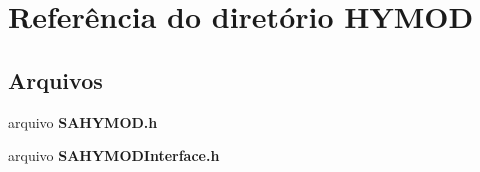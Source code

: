\section{Referência do diretório H\+Y\+M\+OD}
\label{dir_b4ae1e3ddeaf0c87bd6b41d18040ad84}
\subsection*{Arquivos}
\begin{DoxyCompactItemize}
\item 
arquivo {\bf S\+A\+H\+Y\+M\+O\+D.\+h}
\item 
arquivo {\bf S\+A\+H\+Y\+M\+O\+D\+Interface.\+h}
\end{DoxyCompactItemize}
